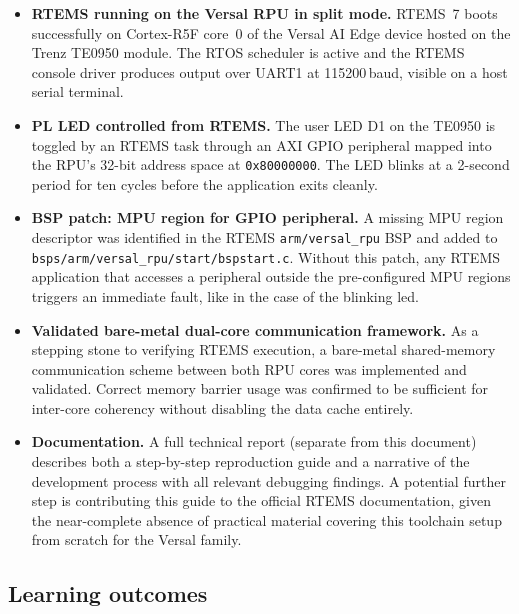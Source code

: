 \documentclass[10pt,a4]{article}
\begin{document}
\begin{itemize}
  \item \textbf{RTEMS running on the Versal RPU in split mode.}
        RTEMS~7 boots successfully on Cortex-R5F core~0 of the Versal AI Edge
        device hosted on the Trenz TE0950 module.
        The RTOS scheduler is active and the RTEMS console driver produces
        output over UART1 at 115200\,baud, visible on a host serial terminal.

  \item \textbf{PL LED controlled from RTEMS.}
        The user LED D1 on the TE0950 is toggled by an RTEMS task through an
        AXI GPIO peripheral mapped into the RPU's 32-bit address space at
        \texttt{0x80000000}.
        The LED blinks at a 2-second period for ten cycles before the
        application exits cleanly.

  \item \textbf{BSP patch: MPU region for GPIO peripheral.}
        A missing MPU region descriptor was identified in the RTEMS
        \texttt{arm/versal\_rpu} BSP and added to
        \texttt{bsps/arm/versal\_rpu/start/bspstart.c}.
        Without this patch, any RTEMS application that accesses a peripheral
        outside the pre-configured MPU regions triggers an immediate fault, 
        like in the case of the blinking led.

  \item \textbf{Validated bare-metal dual-core communication framework.}
        As a stepping stone to verifying RTEMS execution, a bare-metal
        shared-memory communication scheme between both RPU cores was
        implemented and validated.
        Correct memory barrier usage was confirmed to be sufficient for
        inter-core coherency without disabling the data cache entirely.

  \item \textbf{Documentation.}
        A full technical report (separate from this document) describes
        both a step-by-step reproduction guide and a narrative of the
        development process with all relevant debugging findings.
        A potential further step is contributing this guide to the official
        RTEMS documentation, given the near-complete absence of practical
        material covering this toolchain setup from scratch for the Versal family.
\end{itemize}


\subsection{Learning outcomes}
\end{document}
